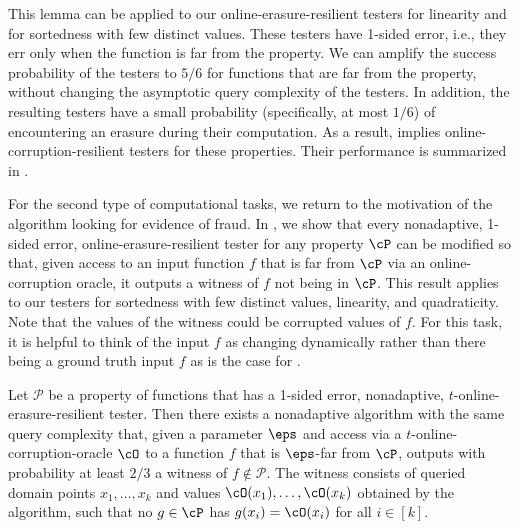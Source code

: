 \documentclass{toc}
\begin{document}
This lemma can be applied to our online-erasure-resilient testers for linearity and for sortedness with few distinct values.  These testers have 1-sided error, i.e., they err only when the function is far from the property. We can amplify the success probability of the testers to $5/6$ for functions that are far from the property, without changing the asymptotic query complexity of the testers. In addition, the resulting testers have a small probability (specifically, at most $1/6$) of encountering an erasure during their computation. As a result,  implies online-corruption-resilient testers for these properties. Their performance is summarized in .

For the second type of computational tasks, we return to the motivation of the algorithm looking for evidence of fraud.  In , we  show that every nonadaptive, 1-sided error, online-erasure-resilient tester for any property $\cP$ can be modified so that, given access to an input function $f$ that is far from $\cP$ via an online-corruption oracle, it outputs a witness of $f$ not being in $\cP$. 
This result applies to our testers for sortedness with few distinct values, linearity, and quadraticity. Note that the values of the witness could be corrupted values of $f$. For this task, it is helpful to think of the input $f$ as changing dynamically rather than there being a ground truth input $f$ as is the case for .

\begin{lemma}\label{lem:detect}
    Let $\mathcal{P}$ be a property of functions that has a 1-sided error, nonadaptive, $t$-online-erasure-resilient tester.
    Then there exists a nonadaptive algorithm with the same query complexity that, given a parameter $\eps$ and access via a $t$-online-corruption-oracle $\cO$ to a function $f$ that is $\eps$-far from $\cP$, outputs with probability at least $2/3$ a witness of  $f \notin \mathcal{P}$. 
    The witness consists of queried domain points $x_1, \dots, x_k$ and values $\cO(x_1), \dots, \cO(x_k)$ obtained by the algorithm, such that no $g \in \cP$ has $g(x_i) = \cO(x_i)$ for all $i \in [k]$. 
\end{lemma}

%
\end{document}
